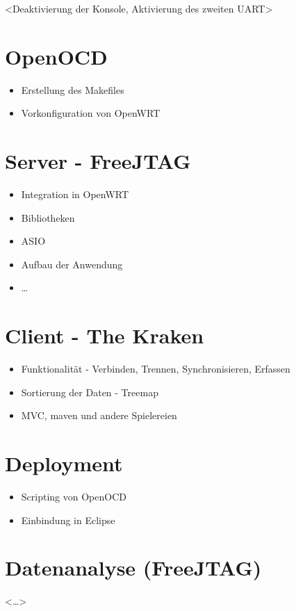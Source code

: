 <Deaktivierung der Konsole, Aktivierung des zweiten UART>
\section{OpenOCD}
\begin{itemize}
  \item Erstellung des Makefiles 
  \item Vorkonfiguration von OpenWRT
\end{itemize}
\section{Server - FreeJTAG}
\begin{itemize}
  \item Integration in OpenWRT
  \item Bibliotheken
  \item ASIO
  \item Aufbau der Anwendung
  \item \ldots
\end{itemize}
\section{Client - The Kraken}
\begin{itemize}
  \item Funktionalität - Verbinden, Trennen, Synchronisieren, Erfassen
  \item Sortierung der Daten - Treemap
  \item MVC, maven und andere Spielereien
\end{itemize}
\section{Deployment}
\begin{itemize}
  \item Scripting von OpenOCD
  \item Einbindung in Eclipse
\end{itemize}
\section{Datenanalyse (FreeJTAG)}
<\ldots>